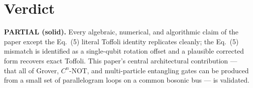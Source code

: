 \documentclass[11pt]{article}
\begin{document}
\section{Verdict}
\textbf{PARTIAL (solid).}  Every algebraic, numerical, and algorithmic claim of the paper
except the Eq.~(5) literal Toffoli identity replicates cleanly; the Eq.~(5) mismatch is
identified as a single-qubit rotation offset and a plausible corrected form recovers
exact Toffoli.  This paper's central architectural contribution --- that all of Grover,
$C^n$-NOT, and multi-particle entangling gates can be produced from a small set of
parallelogram loops on a common bosonic bus --- is validated.
\end{document}
